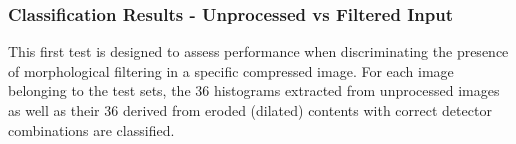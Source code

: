 \documentclass[review]{elsarticle}
\begin{document}
\subsubsection{Classification Results - Unprocessed vs Filtered Input}
This first test is designed to assess performance when discriminating the presence of morphological filtering in a specific compressed image. For each image belonging to the test sets, the $36$ histograms extracted from unprocessed images as well as their $36$ derived from eroded (dilated) contents with correct detector combinations are classified.

\end{document}
